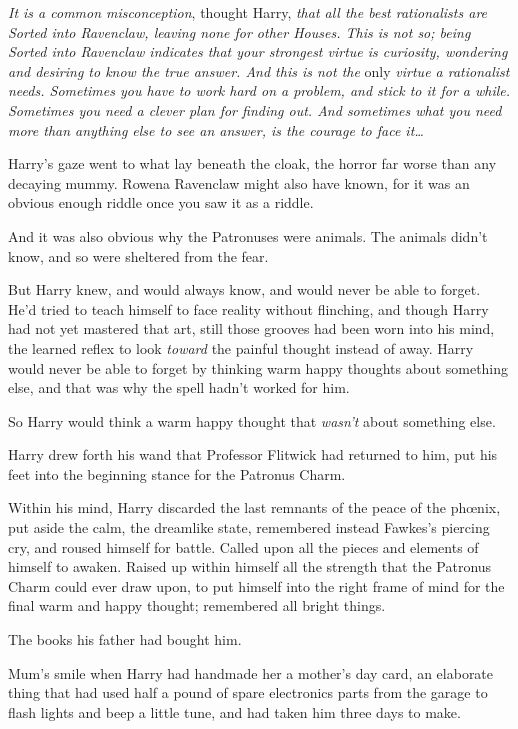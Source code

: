 \emph{It is a common misconception}, thought Harry, \emph{that all the best rationalists are Sorted into Ravenclaw, leaving none for other Houses. This is not so; being Sorted into Ravenclaw indicates that your strongest virtue is curiosity, wondering and desiring to know the true answer. And this is not the} only \emph{virtue a rationalist needs. Sometimes you have to work hard on a problem, and stick to it for a while. Sometimes you need a clever plan for finding out. And sometimes what you need more than anything else to see an answer, is the courage to face it…}

Harry’s gaze went to what lay beneath the cloak, the horror far worse than any decaying mummy. Rowena Ravenclaw might also have known, for it was an obvious enough riddle once you saw it as a riddle.

And it was also obvious why the Patronuses were animals. The animals didn’t know, and so were sheltered from the fear.

But Harry knew, and would always know, and would never be able to forget. He’d tried to teach himself to face reality without flinching, and though Harry had not yet mastered that art, still those grooves had been worn into his mind, the learned reflex to look \emph{toward} the painful thought instead of away. Harry would never be able to forget by thinking warm happy thoughts about something else, and that was why the spell hadn’t worked for him.

So Harry would think a warm happy thought that \emph{wasn’t} about something else.

Harry drew forth his wand that Professor Flitwick had returned to him, put his feet into the beginning stance for the Patronus Charm.

Within his mind, Harry discarded the last remnants of the peace of the phœnix, put aside the calm, the dreamlike state, remembered instead Fawkes’s piercing cry, and roused himself for battle. Called upon all the pieces and elements of himself to awaken. Raised up within himself all the strength that the Patronus Charm could ever draw upon, to put himself into the right frame of mind for the final warm and happy thought; remembered all bright things.

The books his father had bought him.

Mum’s smile when Harry had handmade her a mother’s day card, an elaborate thing that had used half a pound of spare electronics parts from the garage to flash lights and beep a little tune, and had taken him three days to make.

